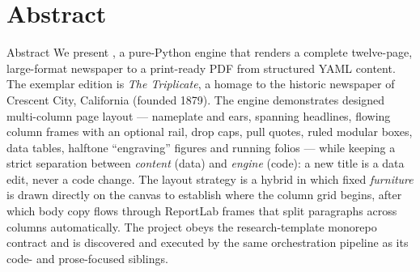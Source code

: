 \documentclass[
  ignorenonframetext,
]{beamer}
\author{\texorpdfstring{}{}}
\date{}
\begin{document}
\section{Abstract}\label{abstract}

\begin{frame}{Abstract}
We present , a pure-Python engine that
renders a complete twelve-page, large-format newspaper to a print-ready
PDF from structured YAML content. The exemplar edition is \emph{The
Triplicate}, a homage to the historic newspaper of Crescent City,
California (founded 1879). The engine demonstrates designed multi-column
page layout --- nameplate and ears, spanning headlines, flowing column
frames with an optional rail, drop caps, pull quotes, ruled modular
boxes, data tables, halftone ``engraving'' figures and running folios
--- while keeping a strict separation between \emph{content} (data) and
\emph{engine} (code): a new title is a data edit, never a code change.
The layout strategy is a hybrid in which fixed \emph{furniture} is drawn
directly on the canvas to establish where the column grid begins, after
which body copy flows through ReportLab frames that split paragraphs
across columns automatically. The project obeys the research-template
monorepo contract and is discovered and executed by the same
orchestration pipeline as its code- and prose-focused siblings.
\end{frame}
\end{document}
